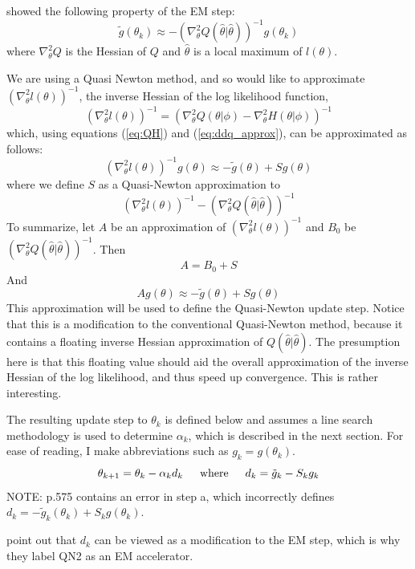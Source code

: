 \documentclass[letter,12pt]{article}
\begin{document}
\cite{jamshidianj93} showed the following property of the EM step:
\begin{equation} \label{eq:ddq_approx}
\tilde{g}(\theta_k) \approx -(\nabla^2_{\theta}Q(\hat{\theta}|\hat{\theta}))^{-1}g(\theta_k)
\end{equation}
where $\nabla^2_{\theta}Q$ is the Hessian of $Q$ and $\hat{\theta}$ is a local maximum of $l(\theta)$.  

We are using a Quasi Newton method, and so would like to approximate  $(\nabla^2_{\theta}l(\theta))^{-1}$, the inverse Hessian of the log likelihood function, 
\[
(\nabla^2_{\theta}l(\theta))^{-1}
=
(\nabla^2_{\theta}Q(\theta|\phi)
-
\nabla^2_{\theta}H(\theta|\phi))^{-1}
\]
which, using equations (\ref{eq:QH}) and (\ref{eq:ddq_approx}), can be approximated as follows:
\[
(\nabla^2_{\theta}l(\theta))^{-1}g(\theta)
\approx
-\tilde{g}(\theta)
+
Sg(\theta)
\]
where we define $S$ as a Quasi-Newton approximation to
\[
(\nabla^2_{\theta}l(\theta))^{-1}-(\nabla^2_{\theta}Q(\hat{\theta}|\hat{\theta}))^{-1}
\]
To summarize, let $A$ be an approximation of $(\nabla^2_{\theta}l(\theta))^{-1}$ and $B_0$ be  $(\nabla^2_{\theta}Q(\hat{\theta}|\hat{\theta}))^{-1}$.  Then
\[
A = B_0 + S
\]
And
\begin{equation} \label{eq:Ag=g-Sg}
Ag(\theta) \approx -\tilde{g}(\theta) + Sg(\theta)
\end{equation}
This approximation will be used to define the Quasi-Newton update step.  Notice that this is a modification to the conventional Quasi-Newton method, because it contains a floating inverse Hessian approximation of $Q(\hat{\theta}|\hat{\theta})$.  The presumption here is that this floating value should aid the overall approximation of the inverse Hessian of the log likelihood, and thus speed up convergence.  This is rather interesting.

The resulting update step to $\theta_k$ is defined below and assumes a line search methodology is used to determine $\alpha_k$, which is described in the next section.  For ease of reading, I make abbreviations such as $g_k = g(\theta_k)$.
\[
\theta_{k+1} = \theta_k - \alpha_k d_k
\indent
\text{where}
\indent
d_k = \tilde{g}_k - S_kg_k
\]
NOTE: \cite{jamshidianj97} p.575 contains an error in step a, which incorrectly defines $d_k=-\tilde{g}_k(\theta_k) + S_kg(\theta_k)$.

\cite{jamshidianj97} point out that $d_k$ can be viewed as a modification to the EM step, which is why they label QN2 as an EM accelerator.
\end{document}
